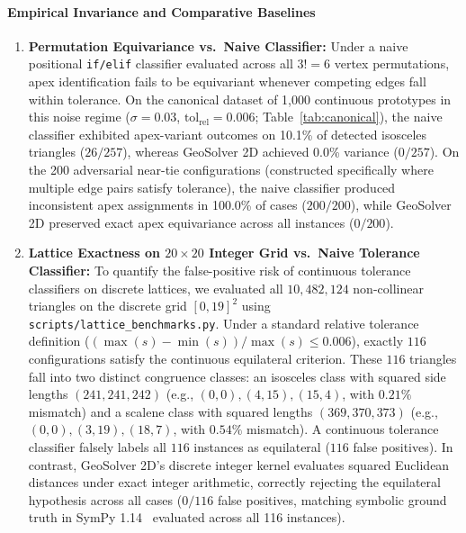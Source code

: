 \documentclass[preprint,12pt]{elsarticle}
\begin{document}
\paragraph{Empirical Invariance and Comparative Baselines}
\begin{enumerate}
\item \textbf{Permutation Equivariance vs.\ Naive Classifier:} Under a naive positional \texttt{if/elif} classifier evaluated across all $3! = 6$ vertex permutations, apex identification fails to be equivariant whenever competing edges fall within tolerance. On the canonical dataset of 1,000 continuous prototypes in this noise regime ($\sigma = 0.03$, $\mathrm{tol_{rel}} = 0.006$; Table~\ref{tab:canonical}), the naive classifier exhibited apex-variant outcomes on 10.1\% of detected isosceles triangles ($26 / 257$), whereas GeoSolver 2D achieved 0.0\% variance ($0 / 257$). On the 200 adversarial near-tie configurations (constructed specifically where multiple edge pairs satisfy tolerance), the naive classifier produced inconsistent apex assignments in 100.0\% of cases ($200 / 200$), while GeoSolver 2D preserved exact apex equivariance across all instances ($0 / 200$).
\item \textbf{Lattice Exactness on $20 \times 20$ Integer Grid vs.\ Naive Tolerance Classifier:} To quantify the false-positive risk of continuous tolerance classifiers on discrete lattices, we evaluated all $10{,}482{,}124$ non-collinear triangles on the discrete grid $[0, 19]^2$ using \texttt{scripts/lattice\_benchmarks.py}. Under a standard relative tolerance definition ($(\max(s) - \min(s)) / \max(s) \le 0.006$), exactly $116$ configurations satisfy the continuous equilateral criterion. These $116$ triangles fall into two distinct congruence classes: an isosceles class with squared side lengths $(241, 241, 242)$ (e.g., $(0,0), (4,15), (15,4)$, with $0.21\%$ mismatch) and a scalene class with squared lengths $(369, 370, 373)$ (e.g., $(0,0), (3,19), (18,7)$, with $0.54\%$ mismatch). A continuous tolerance classifier falsely labels all $116$ instances as equilateral ($116$ false positives). In contrast, GeoSolver 2D's discrete integer kernel evaluates squared Euclidean distances under exact integer arithmetic, correctly rejecting the equilateral hypothesis across all cases ($0 / 116$ false positives, matching symbolic ground truth in SymPy 1.14~\cite{meurer2017} evaluated across all 116 instances).


\end{enumerate}
\end{document}
